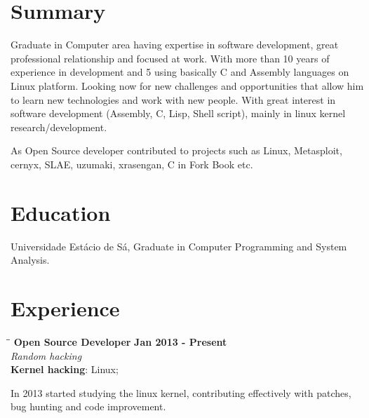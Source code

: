 \documentclass[margin]{res}
\begin{document}

\address{Juazeiro do Norte, CE, Brazil \\
  \href{mailto:geyslan@gmail.com}{geyslan@gmail.com} \\ Phone: 55 88 99617 0441
  \\ Postal Code: 63034-100 }


\begin{resume}

  \section{Summary} Graduate in Computer area having expertise in software
  development, great professional relationship and focused at work.
  With more than 10 years of experience in development and 5 using
  basically C and Assembly languages on Linux platform. Looking now
  for new challenges and opportunities that allow him to learn new
  technologies and work with new people. With great interest in
  software development (Assembly, C, Lisp, Shell script), mainly
  in linux kernel research/development.

  As Open Source developer contributed to projects such as Linux,
  Metasploit, cernyx, SLAE, uzumaki, xrasengan, C in Fork Book etc.

  \section{Education} Universidade Estácio de Sá, Graduate in Computer
  Programming and System Analysis.

\section{Experience}

\vspace{-0.1in}
\begin{tabbing}
  \hspace{2.3in}\= \hspace{1.7in}\= \kill %
  \textbf{Open Source Developer}    \>\>\textbf{Jan 2013 - Present}\\
  \textit{Random hacking}\\
  \textbf{Kernel hacking}: Linux;
\end{tabbing}\vspace{-20pt}      %
\vspace{2mm} In 2013 started studying the linux kernel, contributing
effectively with patches, bug hunting and code improvement.


\end{resume}
\end{document}
